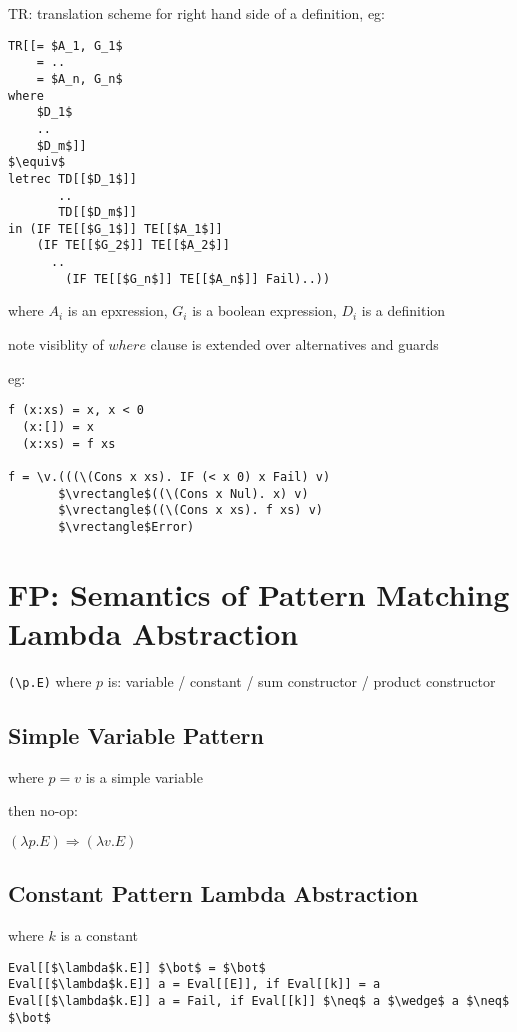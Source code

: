 \documentclass[8pt]{extarticle}
\newcommand*{\vrectangle}{{\setlength{\fboxsep}{0pt}\fbox{\phantom{l}}}}
\begin{document}
\begin{multicols*}{2}
  TR: translation scheme for right hand side of a definition, eg:

\begin{lstlisting}
TR[[= $A_1, G_1$
    = ..
    = $A_n, G_n$
where
    $D_1$
    ..
    $D_m$]]
$\equiv$
letrec TD[[$D_1$]]
       ..
       TD[[$D_m$]]
in (IF TE[[$G_1$]] TE[[$A_1$]]
    (IF TE[[$G_2$]] TE[[$A_2$]]
      ..
        (IF TE[[$G_n$]] TE[[$A_n$]] Fail)..))
\end{lstlisting}
     
  where $A_i$ is an epxression, $G_i$ is a boolean expression, $D_i$ is a definition

  note visiblity of $where$ clause is extended over alternatives and guards

  eg:

\begin{lstlisting}
f (x:xs) = x, x < 0
  (x:[]) = x
  (x:xs) = f xs

f = \v.(((\(Cons x xs). IF (< x 0) x Fail) v)
       $\vrectangle$((\(Cons x Nul). x) v)
       $\vrectangle$((\(Cons x xs). f xs) v)
       $\vrectangle$Error)
\end{lstlisting}

\vfill\null
\columnbreak

\section{FP: Semantics of Pattern Matching Lambda Abstraction}

\verb|(\p.E)| where $p$ is: variable / constant / sum constructor / product constructor

\subsection{Simple Variable Pattern}
where $p=v$ is a simple variable

then no-op:

$(\lambda p.E) \Rightarrow (\lambda v.E)$

\subsection{Constant Pattern Lambda Abstraction}
where $k$ is a constant
\begin{lstlisting}
Eval[[$\lambda$k.E]] $\bot$ = $\bot$
Eval[[$\lambda$k.E]] a = Eval[[E]], if Eval[[k]] = a
Eval[[$\lambda$k.E]] a = Fail, if Eval[[k]] $\neq$ a $\wedge$ a $\neq$ $\bot$
\end{lstlisting}


\end{multicols*}
\end{document}
